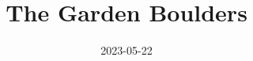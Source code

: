 \documentclass[10pt, twoside]{report}
\begin{document}
\title{The Garden Boulders}
\date{2023-05-22}
\maketitle
\shipout\null

\newcommand\chapterColor{MidnightBlue}

\renewcommand\chapterColor{BrickRed}

\renewcommand\chapterColor{RoyalPurple}

\renewcommand\chapterColor{BurntOrange}

\renewcommand\chapterColor{Aquamarine}

\renewcommand\chapterColor{RubineRed}

\renewcommand\chapterColor{MidnightBlue}

\end{document}
